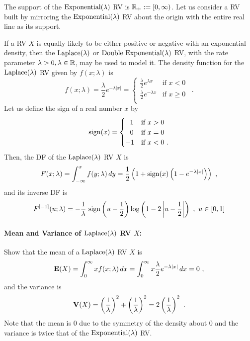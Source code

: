 The support of the $\mbox{{\rm Exponential}}(\lambda)$ RV is $\mathbb{R}_+ := [0,\infty)$.  Let us consider a RV built by mirroring the $\mbox{{\rm Exponential}}(\lambda)$ RV about the origin with the entire real line as its support.
\begin{model}
If a RV $X$ is equally likely to be either positive or negative with an exponential density, then the $\mbox{{\rm Laplace}}(\lambda)$ or $\mbox{{\rm Double~Exponential}}(\lambda)$ RV, with the rate parameter $\lambda>0, \lambda \in \mathbb{R}$, may be used to model it.  The density function for the $\mbox{{\rm Laplace}}(\lambda)$ RV given by $f(x; \lambda)$ is
\begin{equation}\label{E:Laplacepdf}
f(x; \lambda) = \frac{\lambda}{2} e^{- \lambda |x|} =
\begin{cases}
 \frac{\lambda}{2} e^{ \lambda x} & \text{if $x < 0$} \\
 \frac{\lambda}{2} e^{- \lambda x} & \text{if $x \geq 0$} \\
\end{cases}
\enspace .
\end{equation}
Let us define the sign of a real number $x$ by
\[
{\mathop{\rm sign}}(x) =
\begin{cases}
~~1 & \text{if $x > 0$} \\
~~0 & \text{if $x = 0$} \\
-1 & \text{if $x < 0$}  \ . \\
\end{cases}
\]
Then, the DF of the $\mbox{{\rm Laplace}}(\lambda)$ RV $X$ is
\begin{equation} \label{E:Laplacecdf}
F(x; \lambda) = \int_{-\infty}^{x} f(y; \lambda)\,dy = \frac{1}{2}\left(1+ \sign(x) \left(1-e^{- \lambda |x|}\right) \right) \ ,
\end{equation}
and its inverse DF is
\begin{equation}\label{E:LaplaceInvcdf}
F^{[-1]}(u;\lambda) = - \frac{1}{\lambda} \ \sign\left(u-\frac{1}{2}\right) \log \left(1 - 2 \left|u-\frac{1}{2} \right| \right) \ , \ u \in [0,1]
\end{equation}
\end{model}

\paragraph{Mean and Variance of $\mbox{{\rm Laplace}}(\lambda)$ RV $X$:}
Show that the mean of a $\mbox{{\rm Laplace}}(\lambda)$ RV $X$ is
\[
\mathbf{E}(X) = \int_{0}^{\infty} x f(x;\lambda)\,dx
=   \int_{0}^{\infty} x \frac{\lambda}{2} e^{- \lambda |x|}\,dx
= 0 \ ,
\]
and the variance is
\[
\mathbf{V}(X) = \left(  \frac{1}{\lambda} \right)^2 + \left(  \frac{1}{\lambda} \right)^2 = 2 \left(  \frac{1}{\lambda} \right)^2\ .
\]
Note that the mean is $0$ due to the symmetry of the density about $0$ and the variance is twice that of the $\mbox{{\rm Exponential}}(\lambda)$ RV.

